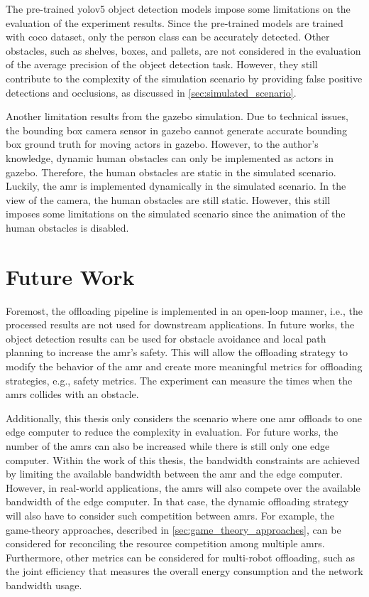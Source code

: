 The pre-trained \gls{yolo}v5 object detection models impose some limitations on the evaluation of the experiment results. Since the pre-trained models are trained with \gls{coco} dataset, only the person class can be accurately detected. Other obstacles, such as shelves, boxes, and pallets, are not considered in the evaluation of the average precision of the object detection task. However, they still contribute to the complexity of the simulation scenario by providing false positive detections and occlusions, as discussed in \cref{sec:simulated_scenario}. 

Another limitation results from the \gls{gazebo} simulation. Due to technical issues, the bounding box camera sensor in \gls{gazebo} cannot generate accurate bounding box ground truth for moving actors in \gls{gazebo}. However, to the author's knowledge, dynamic human obstacles can only be implemented as actors in \gls{gazebo}. Therefore, the human obstacles are static in the simulated scenario. Luckily, the \gls{amr} is implemented dynamically in the simulated scenario. In the view of the camera, the human obstacles are still static. However, this still imposes some limitations on the simulated scenario since the animation of the human obstacles is disabled. 

\section{Future Work}\label{sec:future_works}

Foremost, the offloading pipeline is implemented in an open-loop manner, i.e., the processed results are not used for downstream applications. In future works, the object detection results can be used for obstacle avoidance and local path planning to increase the \gls{amr}'s safety. This will allow the offloading strategy to modify the behavior of the \gls{amr} and create more meaningful metrics for offloading strategies, e.g., safety metrics. The experiment can measure the times when the \glspl{amr} collides with an obstacle.

Additionally, this thesis only considers the scenario where one \gls{amr} offloads to one edge computer to reduce the complexity in evaluation. For future works, the number of the \glspl{amr} can also be increased while there is still only one edge computer. Within the work of this thesis, the bandwidth constraints are achieved by limiting the available bandwidth between the \gls{amr} and the edge computer. However, in real-world applications, the \glspl{amr} will also compete over the available bandwidth of the edge computer. In that case, the dynamic offloading strategy will also have to consider such competition between \glspl{amr}. For example, the game-theory approaches, described in \cref{sec:game_theory_approaches}, can be considered for reconciling the resource competition among multiple \glspl{amr}. Furthermore, other metrics can be considered for multi-robot offloading, such as the joint efficiency that measures the overall energy consumption and the network bandwidth usage.

